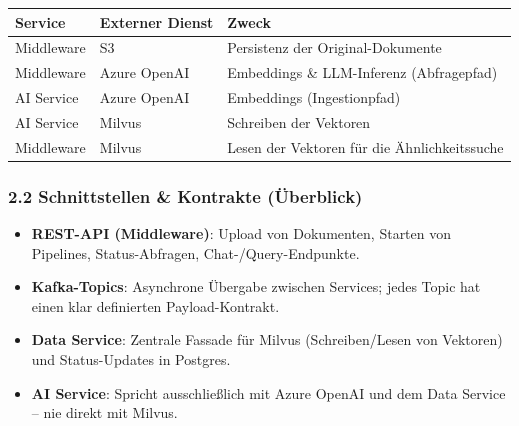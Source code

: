 {\def\LTcaptype{none} %
\begin{longtable}[]{@{}
  >{\raggedright\arraybackslash}p{}
  >{\raggedright\arraybackslash}p{}
  >{\raggedright\arraybackslash}p{}@{}}
\toprule\noalign{}
\begin{minipage}[b]{\linewidth}\raggedright
Service
\end{minipage} & \begin{minipage}[b]{\linewidth}\raggedright
Externer Dienst
\end{minipage} & \begin{minipage}[b]{\linewidth}\raggedright
Zweck
\end{minipage} \\
\midrule\noalign{}
\endhead
\bottomrule\noalign{}
\endlastfoot
Middleware & S3 & Persistenz der Original-Dokumente \\
Middleware & Azure OpenAI & Embeddings \& LLM-Inferenz (Abfragepfad) \\
AI Service & Azure OpenAI & Embeddings (Ingestionpfad) \\
AI Service & Milvus & Schreiben der Vektoren \\
Middleware & Milvus & Lesen der Vektoren für die Ähnlichkeitssuche \\
\end{longtable}
}

\subsubsection{2.2 Schnittstellen \& Kontrakte
(Überblick)}\label{schnittstellen-kontrakte-uxfcberblick}

\begin{itemize}
\tightlist
\item
  \textbf{REST-API (Middleware)}: Upload von Dokumenten, Starten von
  Pipelines, Status-Abfragen, Chat-/Query-Endpunkte.
\item
  \textbf{Kafka-Topics}: Asynchrone Übergabe zwischen Services; jedes
  Topic hat einen klar definierten Payload-Kontrakt.
\item
  \textbf{Data Service}: Zentrale Fassade für Milvus (Schreiben/Lesen
  von Vektoren) und Status-Updates in Postgres.
\item
  \textbf{AI Service}: Spricht ausschließlich mit Azure OpenAI und dem
  Data Service -- nie direkt mit Milvus.
\end{itemize}

